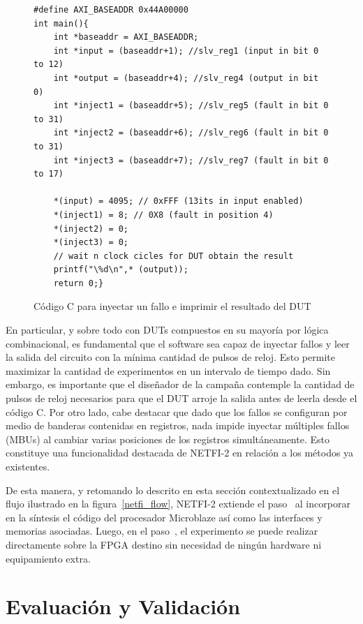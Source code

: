 \documentclass[a4paper,openright,12pt]{report}
\newcommand*\circled[1]{\tikz[baseline=(char.base)]{
            \node[shape=circle,draw,inner sep=0.7pt] (char) {#1};}}
\begin{document}
\begin{figure}[H]
\centering
\begin{lstlisting}
#define AXI_BASEADDR 0x44A00000
int main(){
	int *baseaddr = AXI_BASEADDR;
	int *input = (baseaddr+1); //slv_reg1 (input in bit 0 to 12)
	int *output = (baseaddr+4); //slv_reg4 (output in bit 0)
	int *inject1 = (baseaddr+5); //slv_reg5 (fault in bit 0 to 31)
	int *inject2 = (baseaddr+6); //slv_reg6 (fault in bit 0 to 31)
	int *inject3 = (baseaddr+7); //slv_reg7 (fault in bit 0 to 17)
		
	*(input) = 4095; // 0xFFF (13its in input enabled)
	*(inject1) = 8; // 0X8 (fault in position 4) 
	*(inject2) = 0;
	*(inject3) = 0;
	// wait n clock cicles for DUT obtain the result
	printf("\%d\n",* (output));	
	return 0;}
\end{lstlisting}
	\caption{Código C para inyectar un fallo e imprimir el resultado del DUT}
	\label{c_example}
\end{figure}

En particular, y sobre todo con DUTs compuestos en su mayoría por lógica combinacional, es fundamental que el software sea capaz de inyectar fallos y leer la salida del circuito con la mínima cantidad de pulsos de reloj. Esto permite maximizar la cantidad de experimentos en un intervalo de tiempo dado. Sin embargo, es importante que el diseñador de la campaña contemple la cantidad de pulsos de reloj necesarios para que el DUT arroje la salida antes de leerla desde el código C. Por otro lado, cabe destacar que dado que los fallos se configuran por medio de banderas contenidas en registros, nada impide inyectar múltiples fallos (MBUs) al cambiar varias posiciones de los registros simultáneamente. Esto constituye una funcionalidad destacada de NETFI-2 en relación a los métodos ya existentes.

De esta manera, y retomando lo descrito en esta sección contextualizado en el flujo ilustrado en la figura~\ref{netfi_flow}, NETFI-2 extiende el paso~\circled{3} al incorporar en la síntesis el código del procesador Microblaze así como las interfaces y memorias asociadas. Luego, en el paso~\circled{4}, el experimento se puede realizar directamente sobre la FPGA destino sin necesidad de ningún hardware ni equipamiento extra.

\section{Evaluación y Validación}
\label{EvaluacionValidacion}
\end{document}

